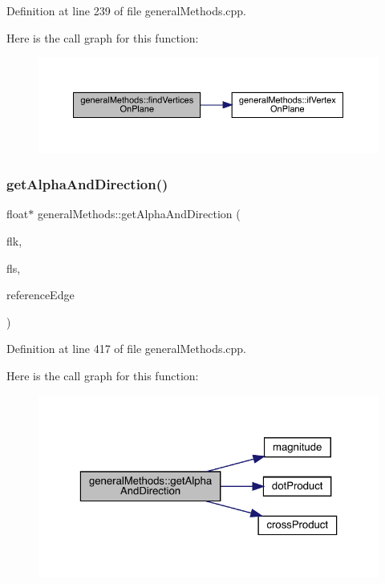 Definition at line 239 of file general\+Methods.\+cpp.

Here is the call graph for this function\+:
\nopagebreak
\begin{figure}[H]
\begin{center}
\leavevmode
\includegraphics[width=350pt]{namespacegeneral_methods_acc1b72abf045cf0d466f2829134e7d66_cgraph}
\end{center}
\end{figure}
\mbox{\label{namespacegeneral_methods_acb2c7a35ffed7d34eff248b9d99aaa6b}} 
\subsubsection{\texorpdfstring{get\+Alpha\+And\+Direction()}{getAlphaAndDirection()}}
{\footnotesize\ttfamily float$\ast$ general\+Methods\+::get\+Alpha\+And\+Direction (\begin{DoxyParamCaption}\item[{face\+Loop}]{flk,  }\item[{face\+Loop}]{fls,  }\item[{edge3D}]{reference\+Edge }\end{DoxyParamCaption})}



Definition at line 417 of file general\+Methods.\+cpp.

Here is the call graph for this function\+:
\nopagebreak
\begin{figure}[H]
\begin{center}
\leavevmode
\includegraphics[width=323pt]{namespacegeneral_methods_acb2c7a35ffed7d34eff248b9d99aaa6b_cgraph}
\end{center}
\end{figure}
\mbox{\label{namespacegeneral_methods_afe4087e253b318326a0a1578d34b42ca}} 
